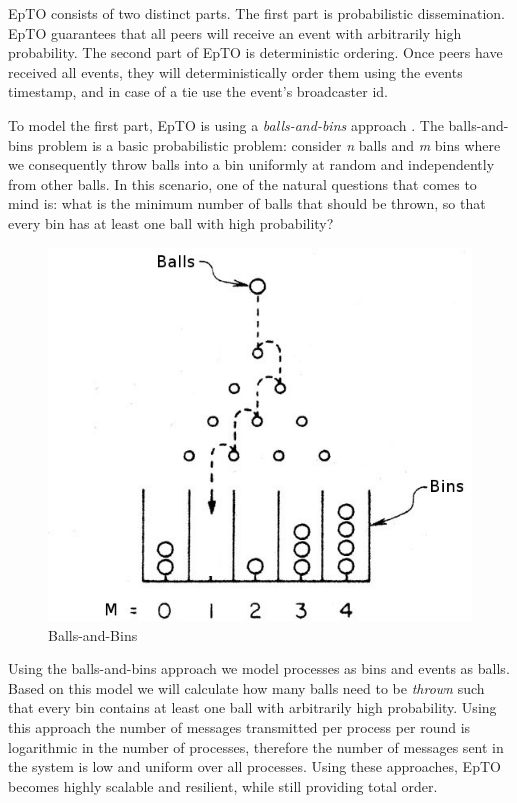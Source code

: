 \documentclass[10pt,conference,a4paper]{IEEEtran}
\begin{document}
EpTO consists of two distinct parts. The first part is probabilistic dissemination. EpTO guarantees that all peers will receive an event with arbitrarily high probability. The second part of EpTO is deterministic ordering. Once peers have received all events, they will deterministically order them using the events timestamp, and in case of a tie use the event's broadcaster id.
\par
To model the first part, EpTO is using a \textit{balls-and-bins} approach \autocite{Koldehofe02simplegossiping}. The balls-and-bins problem is a basic probabilistic problem: consider \textit{n} balls and \textit{m} bins where we consequently throw balls into a bin uniformly at random and independently from other balls. In this scenario, one of the natural questions that comes to mind is: what is the minimum number of balls that should be thrown, so that every bin has at least one ball with high probability?
\begin{figure}
\includegraphics[width=\linewidth]{figures/BnB.jpeg}
\caption{Balls-and-Bins \autocite{bnb}}
\label{fig:balls-and-bins}
\end{figure}
\par
Using the balls-and-bins approach we model processes as bins and events as balls. Based on this model we will calculate how many balls need to be \textit{thrown} such that every bin contains at least one ball with arbitrarily high probability. Using this approach the number of messages transmitted per process per round is logarithmic in the number of processes, therefore the number of messages sent in the system is low and uniform over all processes. Using these approaches, EpTO becomes highly scalable and resilient, while still providing total order.
\end{document}
